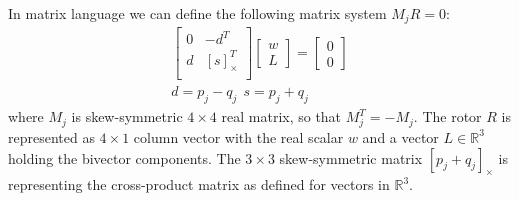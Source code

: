 \documentclass{birkjour}
\numberwithin{equation}{section}
\begin{document}
In matrix language we can define the following matrix system $M_j R = 0$:
\begin{eqnarray*}
\left[\begin{array}{cc}
0             & -d^T \\
d & \left[ s \right]^T_\times \\
\end{array}\right]
\left[\begin{array}{c} w \\ L \end{array}\right] = 
\left[\begin{array}{c} 0 \\ 0  \end{array}\right]\\
d = p_j - q_j \ \ s = p_j + q_j
\end{eqnarray*}
where $M_j$ is skew-symmetric $4\times 4$ real matrix, so that $M_j^T = -M_j$. The rotor $R$ is represented as $4 \times 1$ column vector with the real scalar $w$ and a vector $L \in \mathbb R^3$ holding the bivector components. The $3\times 3$ skew-symmetric matrix $\left[ p_j + q_j \right]_\times$ is representing the cross-product matrix as defined for vectors in $\mathbb R^3$.

\end{document}
